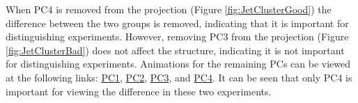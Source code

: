 When PC4 is removed from the projection (Figure
\ref{fig:JetClusterGood}) the difference between the two groups is
removed, indicating that it is important for distinguishing experiments.
However, removing PC3 from the projection (Figure
\ref{fig:JetClusterBad}) does not affect the structure, indicating it is
not important for distinguishing experiments. Animations for the
remaining PCs can be viewed at the following links:
\href{https://nspyrison.netlify.com/thesis/jetcluster_manualtour_pc1/}{PC1},
\href{https://nspyrison.netlify.com/thesis/jetcluster_manualtour_pc2/}{PC2},
\href{https://nspyrison.netlify.com/thesis/jetcluster_manualtour_pc3/}{PC3},
and
\href{https://nspyrison.netlify.com/thesis/jetcluster_manualtour_pc4/}{PC4}.
It can be seen that only PC4 is important for viewing the difference in
these two experiments.

